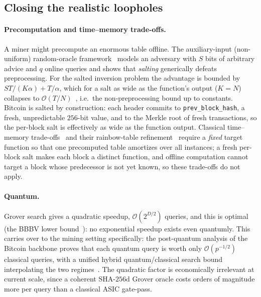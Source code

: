 \documentclass[11pt]{article}
\theoremstyle{remark}
\newcommand{\SHAd}{\mathrm{SHA\text{-}256d}}
\newcommand{\bigO}{\mathcal{O}}
\begin{document}
\subsection{Closing the realistic loopholes}

\paragraph{Precomputation and time--memory trade-offs.}
A miner might precompute an enormous table offline. The auxiliary-input
(non-uniform) random-oracle framework~\cite{unruh,cdgs,cdg} models an
adversary with $S$ bits of arbitrary advice and $q$ online queries and
shows that \emph{salting} generically defeats preprocessing. For the
salted inversion problem the advantage is bounded by
$ST/(K\alpha)+T/\alpha$, which for a salt as wide as the function's
output ($K=N$) collapses to $\bigO(T/N)$~\cite{dgk}, i.e.\ the
non-preprocessing bound up to constants. Bitcoin is salted by
construction: each header commits to \texttt{prev\_block\_hash}, a fresh,
unpredictable $256$-bit value, and to the Merkle root of fresh
transactions, so the per-block salt is effectively as wide as the
function output.
Classical time--memory trade-offs~\cite{hellman} and their rainbow-table
refinement~\cite{rainbow} require a \emph{fixed} target function so that
one precomputed table amortizes over all instances; a fresh per-block
salt makes each block a distinct function, and offline computation cannot
target a block whose predecessor is not yet known, so these trade-offs do
not apply.

\paragraph{Quantum.}
Grover search gives a quadratic speedup, $\bigO(2^{D/2})$ queries, and
this is optimal (the BBBV lower bound~\cite{bbbv}): no exponential
speedup exists even quantumly. This carries over to the mining setting
specifically: the post-quantum analysis of the Bitcoin backbone proves
that each quantum query is worth only $\bigO(p^{-1/2})$ classical queries,
with a unified hybrid quantum/classical search bound interpolating the two
regimes~\cite{pqbackbone,hybrid}. The quadratic factor is economically
irrelevant at current scale, since a coherent $\SHAd$ Grover oracle costs
orders of magnitude more per query than a classical ASIC gate-pass.
\end{document}

